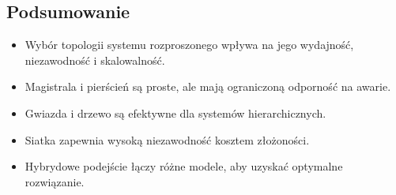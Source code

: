 \subsection{Podsumowanie}
\begin{itemize}
    \item Wybór topologii systemu rozproszonego wpływa na jego wydajność, niezawodność i skalowalność.
    \item Magistrala i pierścień są proste, ale mają ograniczoną odporność na awarie.
    \item Gwiazda i drzewo są efektywne dla systemów hierarchicznych.
    \item Siatka zapewnia wysoką niezawodność kosztem złożoności.
    \item Hybrydowe podejście łączy różne modele, aby uzyskać optymalne rozwiązanie.
\end{itemize}
